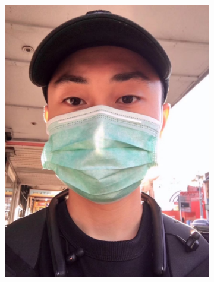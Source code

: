 \begin{figure}[htp]
\begin{subfigure}{0.2\linewidth}
		\includegraphics[width=\linewidth]{imagenes/dataset1-2.jpg}
		\caption{}
		\label{fig:1b}
	\end{subfigure}\hfill	
	\begin{subfigure}{0.2\linewidth}

\end{subfigure}
\end{figure}
